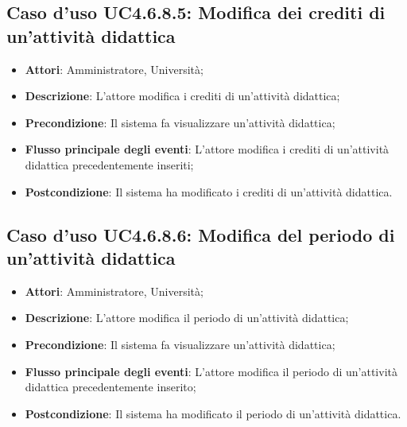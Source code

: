 \subsection{Caso d'uso \texorpdfstring{UC4.6.8.5}{UC4.6.8.5}: Modifica dei crediti di un'attività didattica}
\begin{itemize}
\item \textbf{Attori}: Amministratore, Università;
\item \textbf{Descrizione}: L'attore modifica i crediti di un'attività didattica;

\item \textbf{Precondizione}: Il sistema fa visualizzare un'attività didattica;


\item \textbf{Flusso principale degli eventi}: L'attore modifica i crediti di un'attività didattica precedentemente inseriti;

\item \textbf{Postcondizione}: Il sistema ha modificato i crediti di un'attività didattica.

\end{itemize}
\subsection{Caso d'uso \texorpdfstring{UC4.6.8.6}{UC4.6.8.6}: Modifica del periodo di un'attività didattica}
\begin{itemize}
\item \textbf{Attori}: Amministratore, Università;
\item \textbf{Descrizione}: L'attore modifica il periodo di un'attività didattica;

\item \textbf{Precondizione}: Il sistema fa visualizzare un'attività didattica;


\item \textbf{Flusso principale degli eventi}: L'attore modifica il periodo di un'attività didattica precedentemente inserito;

\item \textbf{Postcondizione}: Il sistema ha modificato il periodo di un'attività didattica.

\end{itemize}
